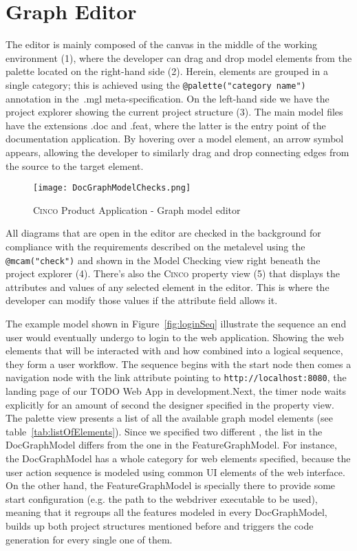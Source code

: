 \section{Graph Editor}\label{sec:graphEditor}

The editor is mainly composed of the canvas in the middle of the working environment (1), where the developer can drag and drop model elements from the palette located on the right-hand side (2). Herein, elements are grouped in a single category; this is achieved using the \lstinline[language=MGL]{@palette("category name")} annotation in the~.mgl meta-specification. On the left-hand side we have the project explorer showing the current project structure (3). The main model files have the extensions .doc and .feat, where the latter is the entry point of the documentation application. By hovering over a model element, an arrow symbol appears, allowing the developer to similarly drag and drop connecting edges from the source to the target element.

\begin{figure}[h]
    \centering
    \texttt{[image: DocGraphModelChecks.png]}
    \caption{\textsc{Cinco} Product Application - Graph model editor}\label{fig:graphDSL}
\end{figure}

All diagrams that are open in the editor are checked in the background for compliance with the requirements described on the metalevel using the \lstinline[language=MGL]{@mcam("check")} and shown in the Model Checking view right beneath the project explorer (4). There's also the \textsc{Cinco} property view (5) that displays the attributes and values of any selected element in the editor. This is where the developer can modify those values if the attribute field allows it.

The example model shown in Figure~\ref{fig:loginSeq} illustrate the sequence an end user would eventually undergo to login to the web application. Showing the web elements that will be interacted with and how combined into a logical sequence, they form a user workflow. The sequence begins with the start node then comes a navigation node with the link attribute pointing to \lstinline{http://localhost:8080}, the landing page of our TODO Web App in development.Next, the timer node waits explicitly for an amount of second the designer specified in the property view. The palette view presents a list of all the available graph model elements (see table~\ref{tab:listOfElements}). Since we specified two different , the list in the DocGraphModel differs from the one in the FeatureGraphModel. For instance, the DocGraphModel has a whole category for web elements specified, because the user action sequence is modeled using common UI elements of the web interface. On the other hand, the FeatureGraphModel is specially there to provide some start configuration (e.g. the path to the webdriver executable to be used), meaning that it regroups all the features modeled in every DocGraphModel, builds up both project structures mentioned before and triggers the code generation for every single one of them.

